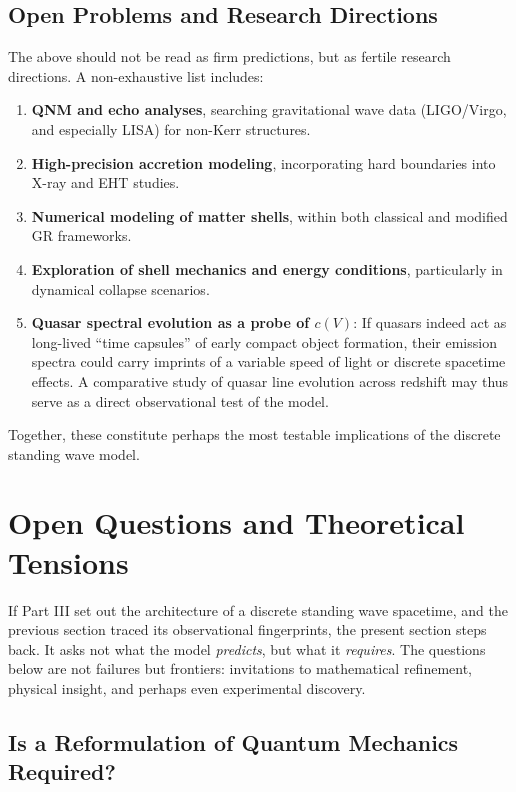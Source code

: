 \documentclass[12pt]{article}
\begin{document}
\subsection{Open Problems and Research Directions}

The above should not be read as firm predictions, but as fertile research directions. A non-exhaustive list includes:

\begin{enumerate}
    \item \textbf{QNM and echo analyses}, searching gravitational wave data (LIGO/Virgo, and especially LISA) for non-Kerr structures.
    \item \textbf{High-precision accretion modeling}, incorporating hard boundaries into X-ray and EHT studies.
    \item \textbf{Numerical modeling of matter shells}, within both classical and modified GR frameworks.
    \item \textbf{Exploration of shell mechanics and energy conditions}, particularly in dynamical collapse scenarios.
    \item \textbf{Quasar spectral evolution as a probe of $c(V)$}: 
    If quasars indeed act as long-lived ``time capsules'' of early compact object formation, their emission spectra could carry imprints of a variable speed of light or discrete spacetime effects. 
    A comparative study of quasar line evolution across redshift may thus serve as a direct observational test of the model.
\end{enumerate}

Together, these constitute perhaps the most testable implications of the discrete standing wave model.

\newpage
\section{Open Questions and Theoretical Tensions}

If Part III set out the architecture of a discrete standing wave spacetime, and the previous section traced its observational fingerprints, the present section steps back. It asks not what the model \emph{predicts}, but what it \emph{requires}. The questions below are not failures but frontiers: invitations to mathematical refinement, physical insight, and perhaps even experimental discovery.

\subsection{Is a Reformulation of Quantum Mechanics Required?}
\end{document}

